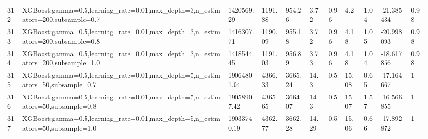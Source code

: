 \begin{longtable}{C{0.8cm} L{2cm} C{1.15cm} C{1.15cm} C{1.15cm} C{1.15cm} C{0.85cm} C{1.25cm} C{1.2cm} C{1.5cm} C{1.0cm}}
312 & XGBoost:\newline gamma=0.5,\newline learning\_rate=0.01,\newline max\_depth=3,\newline n\_estimators=200,\newline subsample=0.7 & 1420569.29 & 1191.88 & 954.26 & 3.72 & 0.96 & 4.2 & 1.04 & -21.385434 & 0.98 \\
313 & XGBoost:\newline gamma=0.5,\newline learning\_rate=0.01,\newline max\_depth=3,\newline n\_estimators=200,\newline subsample=0.8 & 1416307.71 & 1190.09 & 955.18 & 3.72 & 0.96 & 4.18 & 1.05 & -20.998093 & 0.98 \\
314 & XGBoost:\newline gamma=0.5,\newline learning\_rate=0.01,\newline max\_depth=3,\newline n\_estimators=200,\newline subsample=1.0 & 1418544.45 & 1191.03 & 956.89 & 3.73 & 0.96 & 4.18 & 1.04 & -18.617856 & 0.98 \\
315 & XGBoost:\newline gamma=0.5,\newline learning\_rate=0.01,\newline max\_depth=5,\newline n\_estimators=50,\newline subsample=0.7 & 19064801.04 & 4366.33 & 3665.24 & 14.3 & 0.5 & 15.08 & 0.65 & -17.164667 & 1 \\
316 & XGBoost:\newline gamma=0.5,\newline learning\_rate=0.01,\newline max\_depth=5,\newline n\_estimators=50,\newline subsample=0.8 & 19058907.42 & 4365.65 & 3664.07 & 14.3 & 0.5 & 15.07 & 1.57 & -16.566855 & 1 \\
317 & XGBoost:\newline gamma=0.5,\newline learning\_rate=0.01,\newline max\_depth=5,\newline n\_estimators=50,\newline subsample=1.0 & 19033740.19 & 4362.77 & 3662.28 & 14.29 & 0.5 & 15.06 & 0.66 & -17.892872 & 1 \\

\end{longtable}
